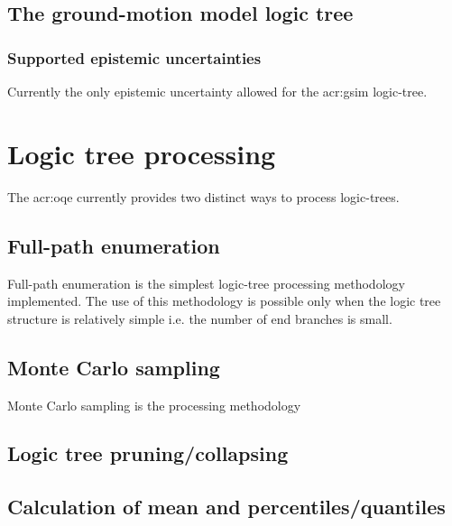 \subsection{The ground-motion model logic tree}
%
\subsubsection{Supported epistemic uncertainties}
Currently the only epistemic uncertainty allowed for the \gls{acr:gsim}
logic-tree.
%
\section{Logic tree processing}
The \gls{acr:oqe} currently provides two distinct ways to process logic-trees.
%
\subsection{Full-path enumeration}
Full-path enumeration is the simplest logic-tree processing methodology
implemented. The use of this methodology is possible only when the logic tree
structure is relatively simple i.e. the number of end branches is small. 
%
\subsection{Monte Carlo sampling}
Monte Carlo sampling is the processing methodology 
%
\subsection{Logic tree pruning/collapsing}
%
\subsection{Calculation of mean and percentiles/quantiles}

